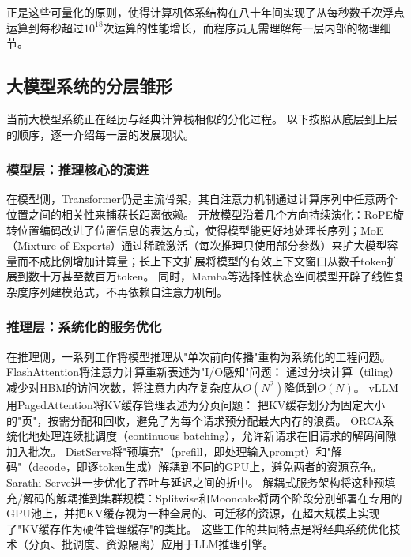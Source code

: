 正是这些可量化的原则，使得计算机体系结构在八十年间实现了从每秒数千次浮点运算到每秒超过$10^{18}$次运算的性能增长，而程序员无需理解每一层内部的物理细节。

\subsection{大模型系统的分层雏形}

当前大模型系统正在经历与经典计算栈相似的分化过程。
以下按照从底层到上层的顺序，逐一介绍每一层的发展现状。

\subsubsection{模型层：推理核心的演进}

在模型侧，Transformer\cite{vaswani2017attention}仍是主流骨架，其自注意力机制通过计算序列中任意两个位置之间的相关性来捕获长距离依赖。
开放模型沿着几个方向持续演化：RoPE旋转位置编码\cite{su2021roformer}改进了位置信息的表达方式，使得模型能更好地处理长序列；MoE（Mixture of Experts）\cite{switch2022,mixtral2024}通过稀疏激活（每次推理只使用部分参数）来扩大模型容量而不成比例增加计算量；长上下文扩展\cite{yarn2024,longrope2024}将模型的有效上下文窗口从数千token扩展到数十万甚至数百万token。
同时，Mamba\cite{gu2024mamba}等选择性状态空间模型开辟了线性复杂度序列建模范式，不再依赖自注意力机制。

\subsubsection{推理层：系统化的服务优化}

在推理侧，一系列工作将模型推理从"单次前向传播"重构为系统化的工程问题。
FlashAttention\cite{dao2022flashattention,dao2023flashattention2}将注意力计算重新表述为"I/O感知"问题：
通过分块计算（tiling）减少对HBM的访问次数，将注意力内存复杂度从$O(N^2)$降低到$O(N)$。
vLLM用PagedAttention\cite{kwon2023pagedattention}将KV缓存管理表述为分页问题：
把KV缓存划分为固定大小的"页"，按需分配和回收，避免了为每个请求预分配最大内存的浪费。
ORCA\cite{orca2022}系统化地处理连续批调度（continuous batching），允许新请求在旧请求的解码间隙加入批次。
DistServe\cite{zhong2024distserve}将"预填充"（prefill，即处理输入prompt）和"解码"（decode，即逐token生成）解耦到不同的GPU上，避免两者的资源竞争。
Sarathi-Serve\cite{agrawal2024sarathi}进一步优化了吞吐与延迟之间的折中。
解耦式服务架构将这种预填充/解码的解耦推到集群规模：Splitwise\cite{patel2024splitwise}和Mooncake\cite{qin2024mooncake}将两个阶段分别部署在专用的GPU池上，并把KV缓存视为一种全局的、可迁移的资源，在超大规模上实现了"KV缓存作为硬件管理缓存"的类比。
这些工作的共同特点是将经典系统优化技术（分页、批调度、资源隔离）应用于LLM推理引擎。

